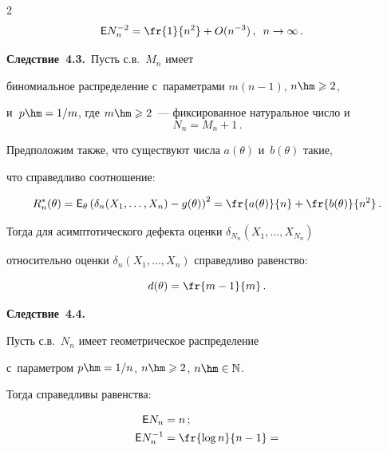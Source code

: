 \begin{multicols}{2}
\begin{align*}
{\sf E} N_n^{-2} &= \fr{1}{n^2} + O (n^{-3})\,,\enskip n \to \infty\,.


\end{align*}








\noindent


\textbf{Следствие~4.3.}\ Пусть с.в.~$M_n$ имеет 


биномиальное распределение с~параметрами $m(n-1)$, $n \hm\geqslant 2$, 


и~$p \hm= 1/m$, где $m\hm \geqslant 2$~--- фиксированное натуральное число и~$$


N_n = M_n + 1\,.


$$


Предположим также, что существуют числа $a(\theta)$ и~$b(\theta)$ такие, 


что справедливо соотношение:


$$ %


R^*_n(\theta) = {\sf E}_\theta\left(\delta_{n}(X_1,\ldots,X_{n}) - g(\theta)\right)^2 


= \fr{a(\theta)}{n} + \fr{b(\theta)}{n^2}\,.


$$ %


Тогда для асимптотического дефекта оценки $\delta_{N_n}(X_1,\ldots,X_{N_n})$


 относительно оценки $\delta_n(X_1,\ldots,X_n)$ справедливо равенство:


$$


d(\theta) = \fr{m - 1}{m}\,.


$$








\noindent


\textbf{Следствие~4.4.}\ 


Пусть с.в.~$N_n$ имеет геометрическое распределение 


с~параметром $p\hm = 1/n$, $n\hm \geqslant 2$, $n\hm \in \mathbb{N}$. 


Тогда справедливы равенства:


\begin{align*}


{\sf E} N_n &= n\,;


\\


{\sf E} N_n^{-1} &= \fr{\log n}{n - 1} = 



\end{align*}
\end{multicols}
